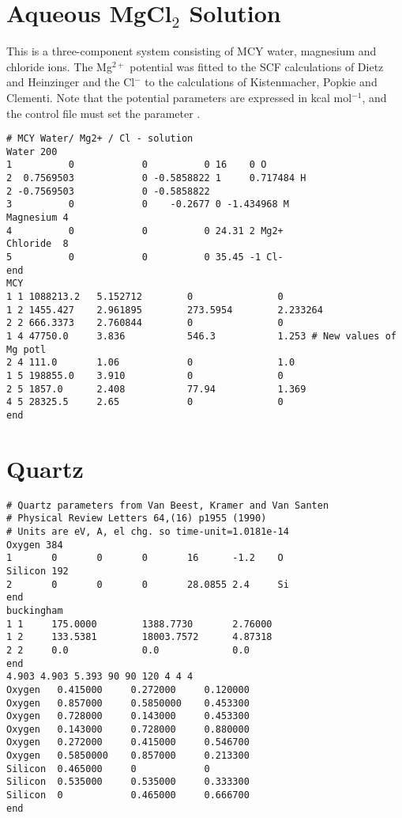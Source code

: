 \documentclass[a4paper,twoside]{report}
\begin{document}
\section{Aqueous MgCl$_2$ Solution}%
This is a three-component system consisting of MCY
water\cite{matsuoka:75}, magnesium and chloride ions.  The Mg$^{2+}$
potential was fitted to the SCF calculations of Dietz and
Heinzinger\cite{dietz:82} and the Cl$^-$ to the calculations of
Kistenmacher, Popkie and Clementi\cite{kistenmacher:73b}.  Note that
the potential parameters are expressed in kcal mol$^{-1}$, and the
control file must set the parameter .
\begin{verbatim}
# MCY Water/ Mg2+ / Cl - solution
Water 200
1          0            0          0 16    0 O
2  0.7569503            0 -0.5858822 1     0.717484 H
2 -0.7569503            0 -0.5858822
3          0            0    -0.2677 0 -1.434968 M
Magnesium 4
4          0            0          0 24.31 2 Mg2+
Chloride  8
5          0            0          0 35.45 -1 Cl-
end
MCY
1 1 1088213.2   5.152712        0               0
1 2 1455.427    2.961895        273.5954        2.233264
2 2 666.3373    2.760844        0               0
1 4 47750.0     3.836           546.3           1.253 # New values of Mg potl
2 4 111.0       1.06            0               1.0   
1 5 198855.0    3.910           0               0
2 5 1857.0      2.408           77.94           1.369
4 5 28325.5     2.65            0               0
end
\end{verbatim}
\section{Quartz}%
\begin{verbatim}
# Quartz parameters from Van Beest, Kramer and Van Santen
# Physical Review Letters 64,(16) p1955 (1990)
# Units are eV, A, el chg. so time-unit=1.0181e-14
Oxygen 384
1       0       0       0       16      -1.2    O
Silicon 192
2       0       0       0       28.0855 2.4     Si
end
buckingham
1 1     175.0000        1388.7730       2.76000
1 2     133.5381        18003.7572      4.87318
2 2     0.0             0.0             0.0
end
4.903 4.903 5.393 90 90 120 4 4 4
Oxygen   0.415000     0.272000     0.120000
Oxygen   0.857000     0.5850000    0.453300
Oxygen   0.728000     0.143000     0.453300
Oxygen   0.143000     0.728000     0.880000
Oxygen   0.272000     0.415000     0.546700
Oxygen   0.5850000    0.857000     0.213300
Silicon  0.465000     0            0
Silicon  0.535000     0.535000     0.333300
Silicon  0            0.465000     0.666700
end
\end{verbatim}
\end{document}
